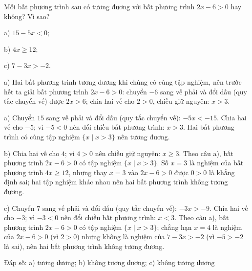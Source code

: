 \begin{problem}[9DS-BPT-023]
Mỗi bất phương trình sau có tương đương với bất phương trình $2x - 6 > 0$ hay không? Vì sao?

a) $15 - 5x < 0$;

b) $4x \geq 12$;

c) $7 - 3x > -2$.

\begin{solution}
a) Hai bất phương trình tương đương khi chúng có cùng tập nghiệm, nên trước hết ta giải bất phương trình $2x - 6 > 0$: chuyển $-6$ sang vế phải và đổi dấu (quy tắc chuyển vế) được $2x > 6$; chia hai vế cho $2 > 0$, chiều giữ nguyên: $x > 3$.

a) Chuyển $15$ sang vế phải và đổi dấu (quy tắc chuyển vế): $-5x < -15$. Chia hai vế cho $-5$; vì $-5 < 0$ nên đổi chiều bất phương trình: $x > 3$. Hai bất phương trình có cùng tập nghiệm $\{x \mid x > 3\}$ nên tương đương.

b) Chia hai vế cho $4$; vì $4 > 0$ nên chiều giữ nguyên: $x \geq 3$. Theo câu a), bất phương trình $2x - 6 > 0$ có tập nghiệm $\{x \mid x > 3\}$. Số $x = 3$ là nghiệm của bất phương trình $4x \geq 12$, nhưng thay $x = 3$ vào $2x - 6 > 0$ được $0 > 0$ là khẳng định sai; hai tập nghiệm khác nhau nên hai bất phương trình không tương đương.

c) Chuyển $7$ sang vế phải và đổi dấu (quy tắc chuyển vế): $-3x > -9$. Chia hai vế cho $-3$; vì $-3 < 0$ nên đổi chiều bất phương trình: $x < 3$. Theo câu a), bất phương trình $2x - 6 > 0$ có tập nghiệm $\{x \mid x > 3\}$; chẳng hạn $x = 4$ là nghiệm của $2x - 6 > 0$ (vì $2 > 0$) nhưng không là nghiệm của $7 - 3x > -2$ (vì $-5 > -2$ là sai), nên hai bất phương trình không tương đương.

Đáp số: a) $\boxed{\text{tương đương}}$; b) $\boxed{\text{không tương đương}}$; c) $\boxed{\text{không tương đương}}$
\end{solution}
\end{problem}


